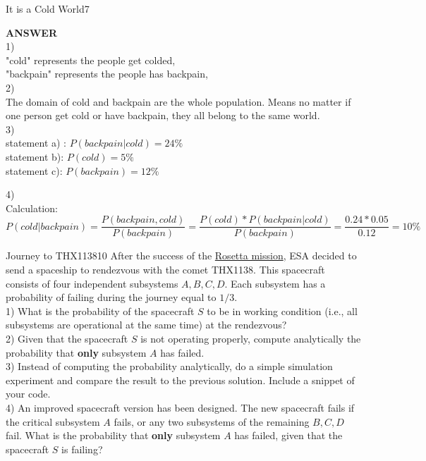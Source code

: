 \begin{questions}
\begin{question}{It is a Cold World}{7}
\begin{answer}
\textbf{ANSWER}\\
1)\\
"cold" represents the people get colded,\\
"backpain" represents the people has backpain,\\
2)\\
The domain of cold and backpain are the whole population. Means no matter if one person get cold or have backpain, they all belong to the same world.\\
3)\\
statement a) : $P(backpain | cold) = 24\%$ \\
statement b): $P(cold) = 5\%$ \\
statement c): $P(backpain) = 12\%$

4)\\
Calculation:\\
 $$P(cold | backpain) =\frac{P(backpain, cold)}{P(backpain)} = \frac{P(cold)*P(backpain | cold)}{P(backpain)} = \frac{0.24 * 0.05}{0.12} =  10\%$$

\end{answer}

\end{question}

\newpage

\begin{question}{Journey to THX1138}{10}
	After the success of the \href{http://rosetta.esa.int/}{Rosetta mission}, ESA decided to send a spaceship to rendezvous with the comet THX1138. 
	This spacecraft consists of four independent subsystems $A,B,C,D$. 
	Each subsystem has a probability of failing during the journey equal to $1/3$. 
	\\
	1) What is the probability of the spacecraft $S$ to be in working condition (i.e., all subsystems are operational at the same time) at the rendezvous?
	\\
	2) Given that the spacecraft $S$ is not operating properly, compute	analytically the probability that \textbf{only} subsystem $A$ has failed. 
	\\
	3) Instead of computing the probability analytically, do a simple simulation experiment and compare the result to the previous solution. 
	Include a snippet of your code. 
	\\
	4) An improved spacecraft version has been designed.
	The new spacecraft fails if the critical subsystem $A$ fails, or any two subsystems of the remaining $B,C,D$ fail. 
	What is the probability that \textbf{only} subsystem $A$ has failed, given that the spacecraft $S$ is failing? 
	

\end{question}
\end{questions}
